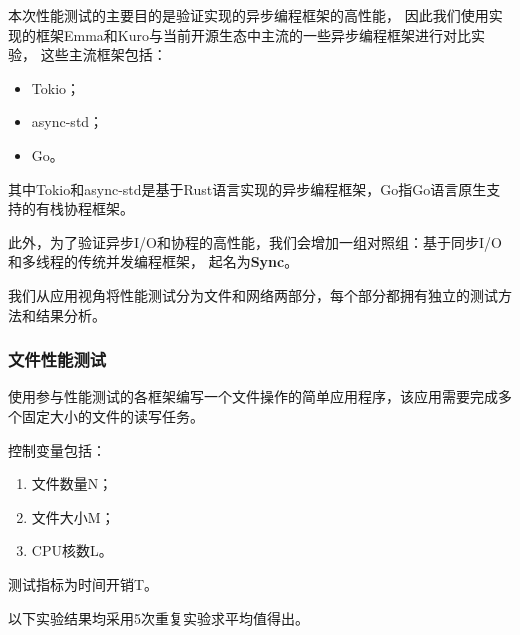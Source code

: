 \documentclass[supercite]{HustGraduPaper}
\theoremstyle{definition}
\begin{document}
本次性能测试的主要目的是验证实现的异步编程框架的高性能，
因此我们使用实现的框架Emma和Kuro与当前开源生态中主流的一些异步编程框架进行对比实验，
这些主流框架包括：

\begin{itemize}
  \item Tokio；
  \item async-std；
  \item Go。
\end{itemize}

其中Tokio和async-std是基于Rust语言实现的异步编程框架，Go指Go语言原生支持的有栈协程框架。\par

此外，为了验证异步I/O和协程的高性能，我们会增加一组对照组：基于同步I/O和多线程的传统并发编程框架，
起名为\textbf{Sync}。\par

我们从应用视角将性能测试分为文件和网络两部分，每个部分都拥有独立的测试方法和结果分析。\par

\subsubsection{文件性能测试}


使用参与性能测试的各框架编写一个文件操作的简单应用程序，该应用需要完成多个固定大小的文件的读写任务。\par

控制变量包括：

\begin{enumerate}
  \item 文件数量N；
  \item 文件大小M；
  \item CPU核数L。
\end{enumerate}

测试指标为时间开销T。\par

以下实验结果均采用5次重复实验求平均值得出。\par
\end{document}
